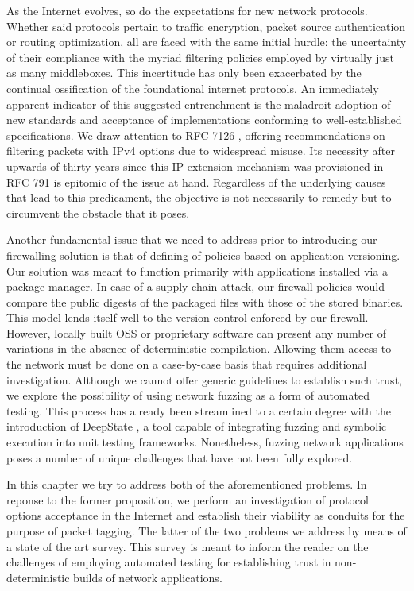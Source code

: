 As the Internet evolves, so do the expectations for new network protocols. Whether said protocols pertain to traffic encryption, packet source authentication or routing optimization, all are faced with the same initial hurdle: the uncertainty of their compliance with the myriad filtering policies employed by virtually just as many middleboxes. This incertitude has only been exacerbated by the continual ossification of the foundational internet protocols. An immediately apparent indicator of this suggested entrenchment is the maladroit adoption of new standards and acceptance of implementations conforming to well-established specifications. We draw attention to RFC 7126 \cite{RFC7126}, offering recommendations on filtering packets with IPv4 options due to widespread misuse. Its necessity after upwards of thirty years since this IP extension mechanism was provisioned in RFC 791 \cite{RFC0791} is epitomic of the issue at hand. Regardless of the underlying causes that lead to this predicament, the objective is not necessarily to remedy but to circumvent the obstacle that it poses.

Another fundamental issue that we need to address prior to introducing our firewalling solution is that of defining of policies based on application versioning. Our solution was meant to function primarily with applications installed via a package manager. In case of a supply chain attack, our firewall policies would compare the public digests of the packaged files with those of the stored binaries. This model lends itself well to the version control enforced by our firewall. However, locally built OSS or proprietary software can present any number of variations in the absence of deterministic compilation. Allowing them access to the network must be done on a case-by-case basis that requires additional investigation. Although we cannot offer generic guidelines to establish such trust, we explore the possibility of using network fuzzing as a form of automated testing. This process has already been streamlined to a certain degree with the introduction of DeepState \cite{goodman2018deepstate}, a tool capable of integrating fuzzing and symbolic execution into unit testing frameworks. Nonetheless, fuzzing network applications poses a number of unique challenges that have not been fully explored.

In this chapter we try to address both of the aforementioned problems. In reponse to the former proposition, we perform an investigation of protocol options acceptance in the Internet and establish their viability as conduits for the purpose of packet tagging. The latter of the two problems we address by means of a state of the art survey. This survey is meant to inform the reader on the challenges of employing automated testing for establishing trust in non-deterministic builds of network applications.
